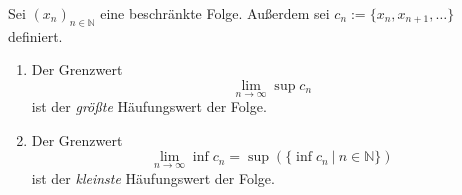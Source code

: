 Sei $(x_n)_{n \in \mathbb{N}}$ eine beschränkte Folge. Außerdem sei $c_n := \{x_n, x_{n+1}, \dots\}$ definiert.
\begin{enumerate}
    \item Der Grenzwert $$\lim_{n \to \infty} \sup c_n$$ ist der \textit{größte} Häufungswert der Folge.
    \item Der Grenzwert $$\lim_{n \to \infty} \inf c_n = \sup(\{\inf c_n \ | \ n \in \mathbb{N}\})$$ ist der \textit{kleinste} Häufungswert der Folge.
\end{enumerate}